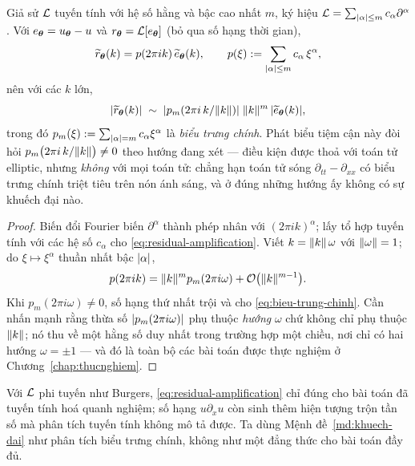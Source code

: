 \begin{menhde}
\label{md:khuech-dai}
Giả sử $\mathcal{L}$ tuyến tính với hệ số hằng và bậc cao nhất $m$, ký hiệu
$\mathcal{L} = \sum_{\lvert\alpha\rvert\le m} c_\alpha \partial^{\alpha}$. Với
$e_{\bm{\theta}} = u_{\bm{\theta}} - u$ và $r_{\bm{\theta}} = \mathcal{L}[e_{\bm{\theta}}]$ (bỏ qua số
hạng thời gian),
\begin{equation}
\widetilde{r}_{\bm{\theta}}(k)
 = p(2\pi i k)\, \widetilde{e}_{\bm{\theta}}(k),
\qquad
p(\xi) := \sum_{\lvert\alpha\rvert\le m} c_\alpha\, \xi^{\alpha},
\label{eq:residual-amplification}
\end{equation}
nên với các $k$ lớn,
\begin{equation}
\lvert\widetilde{r}_{\bm{\theta}}(k)\rvert
 \;\sim\; \lvert p_m\!\left(2\pi i\,k/\lVert k\rVert\right)\rvert\;
   \lVert k\rVert^{m}\,\lvert\widetilde{e}_{\bm{\theta}}(k)\rvert,
\label{eq:bieu-trung-chinh}
\end{equation}
trong đó $p_m(\xi) := \sum_{\lvert\alpha\rvert=m} c_\alpha \xi^{\alpha}$ là
\emph{biểu trưng chính}. Phát biểu tiệm cận này đòi hỏi
$p_m\big(2\pi i\,k/\lVert k\rVert\big) \ne 0$ theo hướng đang xét --- điều kiện được
thoả với toán tử elliptic, nhưng \emph{không} với mọi toán tử: chẳng hạn toán tử
sóng $\partial_{tt} - \partial_{xx}$ có biểu trưng chính triệt tiêu trên nón ánh
sáng, và ở đúng những hướng ấy không có sự khuếch đại nào.
\end{menhde}
 
\begin{proof}
Biến đổi Fourier biến $\partial^{\alpha}$ thành phép nhân với
$(2\pi i k)^{\alpha}$; lấy tổ hợp tuyến tính với các hệ số $c_\alpha$ cho
\eqref{eq:residual-amplification}. Viết $k = \lVert k\rVert\,\omega$ với
$\lVert\omega\rVert = 1$; do $\xi \mapsto \xi^{\alpha}$ thuần nhất bậc
$\lvert\alpha\rvert$,
\[
p(2\pi i k) = \lVert k\rVert^{m} p_m(2\pi i \omega)
 + \mathcal{O}\big(\lVert k\rVert^{m-1}\big).
\]
Khi $p_m(2\pi i\omega) \ne 0$, số hạng thứ nhất trội và cho
\eqref{eq:bieu-trung-chinh}. Cần nhấn mạnh rằng thừa số
$\lvert p_m(2\pi i\omega)\rvert$ phụ thuộc \emph{hướng} $\omega$ chứ không chỉ phụ
thuộc $\lVert k\rVert$; nó thu về một hằng số duy nhất trong trường hợp một chiều, nơi
chỉ có hai hướng $\omega = \pm 1$ --- và đó là toàn bộ các bài toán được thực
nghiệm ở Chương~\ref{chap:thucnghiem}.
\end{proof}
 
Với $\mathcal{L}$ phi tuyến như Burgers, \eqref{eq:residual-amplification} chỉ đúng cho
bài toán đã tuyến tính hoá quanh nghiệm; số hạng $u\partial_x u$ còn sinh thêm
hiện tượng trộn tần số mà phân tích tuyến tính không mô tả được. Ta dùng
Mệnh đề~\ref{md:khuech-dai} như phân tích biểu trưng chính, không như một đẳng thức
cho bài toán đầy đủ.
 
